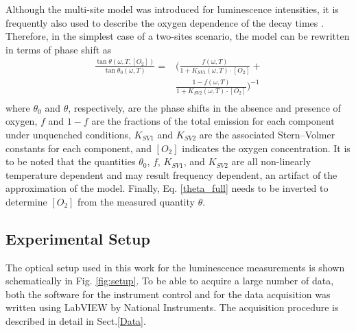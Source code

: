 \documentclass[9pt,twocolumn,twoside,pdftex]{optica}
\begin{document}
Although the multi-site model was introduced for luminescence intensities, it is frequently also used to describe the oxygen dependence of the decay times \cite{Demas1995,Quaranta2012}. Therefore, in the simplest case of a two-sites scenario, the model can be rewritten in terms of phase shift as \cite{Michelucci2019}
\begin{equation}
\begin{aligned}
\frac{\tan \theta (\omega, T, [O_2])}{\tan \theta_0 (\omega, T)} =& \bigg( \frac{f (\omega , T) }{1+K_{SV1} (\omega , T) \cdot \left[O_2\right]}+ \\
&\frac{1-f (\omega , T) }{1+K_{SV2} (\omega , T) \cdot \left[O_2\right]} \bigg)^{-1} \\
\label{theta_full}
\end{aligned}
\end{equation}
where $\theta_0$ and $\theta$, respectively, are the phase shifts in the absence and presence of oxygen, $f$ and $1-f$ are the fractions of the total emission for each component under unquenched conditions, $K_{SV1}$ and $K_{SV2}$ are the associated Stern–Volmer constants for each component, and $\left[O_2\right]$ indicates the oxygen concentration. It is to be noted that the quantities $\theta_0$, $f$, $K_{SV1}$, and $K_{SV2}$ are all non-linearly temperature dependent \cite{Ogurtsov2006,lo2008,Zaitsev2016} and may result frequency dependent, an artifact of the approximation of the model. Finally, Eq. \ref{theta_full} needs to be inverted to determine $[O_2]$ from the measured quantity $\theta$.


\subsection{Experimental Setup}
\label{Experimental}


The optical setup used in this work for the luminescence measurements is shown schematically in Fig. \ref{fig:setup}. To be able to acquire a large number of data, both the software for the instrument control and for the data acquisition was written using LabVIEW by National Instruments. The acquisition procedure is described in detail in Sect.\ref{Data}.
\end{document}
